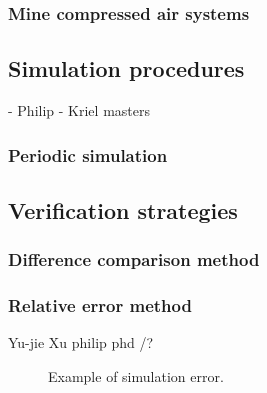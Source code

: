 	\subsubsection{Mine compressed air systems}
		
	\subsection{Simulation procedures}
		- Philip
		- Kriel masters\\
		\subsubsection{Periodic simulation}
 	\subsection{Verification strategies}
 	
 	\subsubsection{Difference comparison method}
 	\subsubsection{Relative error method}
 	Yu-jie Xu \cite{xu2016modeling}
 	philip phd /?
 	
 	\begin{figure}[h!]
 		\centering
 		\caption{Example of simulation error.\cite{Mare2016PhD}}
 		\label{fig:Philipp Diffeence verify}
 	\end{figure}
